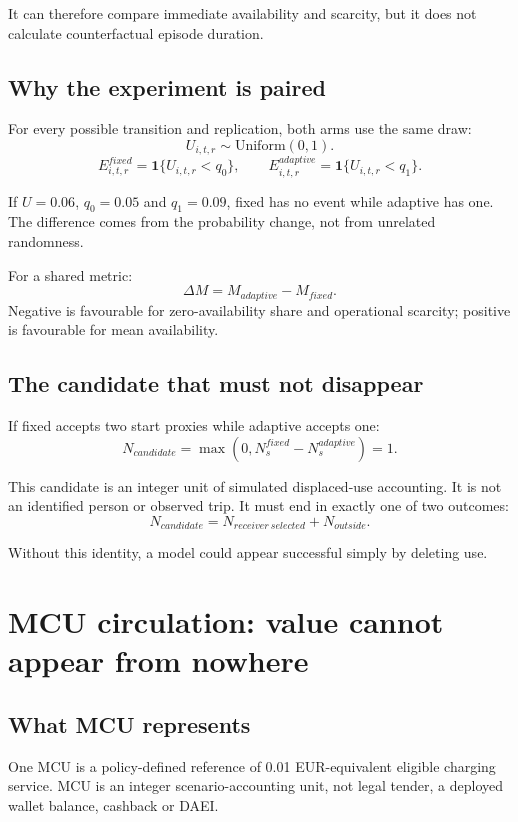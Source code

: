 \documentclass[11pt,a4paper]{article}
\begin{document}
It can therefore compare immediate availability and scarcity, but it does not calculate counterfactual episode duration.

\subsection{Why the experiment is paired}

For every possible transition and replication, both arms use the same draw:
\[
U_{i,t,r}\sim\mathrm{Uniform}(0,1).
\]
\[
E^{fixed}_{i,t,r}=\mathbf{1}\{U_{i,t,r}<q_0\},
\qquad
E^{adaptive}_{i,t,r}=\mathbf{1}\{U_{i,t,r}<q_1\}.
\]

If $U=0.06$, $q_0=0.05$ and $q_1=0.09$, fixed has no event while adaptive has one. The difference comes from the probability change, not from unrelated randomness.

For a shared metric:
\[
\Delta M=M_{adaptive}-M_{fixed}.
\]
Negative is favourable for zero-availability share and operational scarcity; positive is favourable for mean availability.

\subsection{The candidate that must not disappear}

If fixed accepts two start proxies while adaptive accepts one:
\[
N_{candidate}
=\max(0,N_s^{fixed}-N_s^{adaptive})=1.
\]

This candidate is an integer unit of simulated displaced-use accounting. It is not an identified person or observed trip. It must end in exactly one of two outcomes:
\[
N_{candidate}=N_{receiver\ selected}+N_{outside}.
\]

Without this identity, a model could appear successful simply by deleting use.

\section{MCU circulation: value cannot appear from nowhere}

\subsection{What MCU represents}

One MCU is a policy-defined reference of 0.01 EUR-equivalent eligible charging service. MCU is an integer scenario-accounting unit, not legal tender, a deployed wallet balance, cashback or DAEI.
\end{document}
